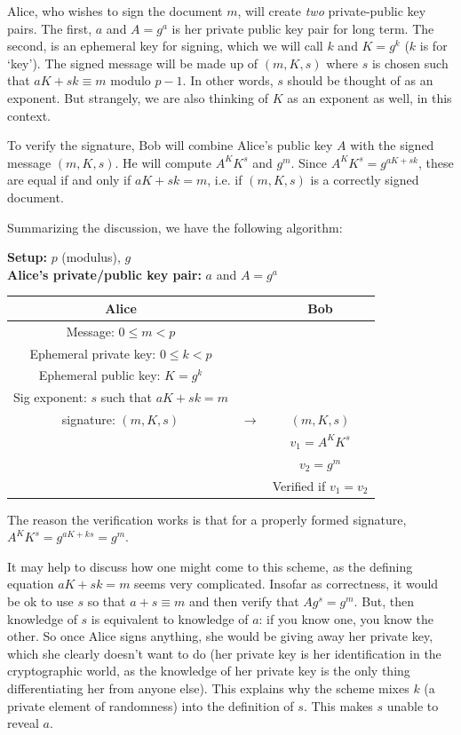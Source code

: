 \documentclass{article}
\theoremstyle{plain}
\theoremstyle{definition}
\theoremstyle{remark}
\numberwithin{theorem}{section}
\begin{document}
Alice, who wishes to sign the document $m$, will create \emph{two} private-public key pairs.  The first, $a$ and $A = g^a$ is her private public key pair for long term.  The second, is an ephemeral key for signing, which we will call $k$ and $K = g^k$ ($k$ is for `key').  The signed message will be made up of $(m, K, s)$ where $s$ is chosen such that $aK + sk\equiv m$ modulo $p-1$.  In other words, $s$ should be thought of as an exponent.  But strangely, we are also thinking of $K$ as an exponent as well, in this context.

To verify the signature, Bob will combine Alice's public key $A$ with the signed message $(m,K,s)$.  He will compute $A^K K^s$ and $g^m$.  Since $A^K K^s = g^{aK + sk}$, these are equal if and only if $aK + sk = m$, i.e. if $(m,K,s)$ is a correctly signed document. 

Summarizing the discussion, we have the following algorithm:

     {\bf Setup:}  $p$ (modulus), $g$ \\
     {\bf Alice's private/public key pair:} $a$ and $A = g^a$
     \vspace{1em}

     \begin{tabular}{ccc}
       Alice & & Bob \\
       \hline
       Message: $0 \le m < p$ & &   \\
       Ephemeral private key: $0 \le k < p$ & &   \\
       Ephemeral public key: $K = g^k$ & &   \\
       Sig exponent: $s$ such that $aK + sk = m$ & & \\
       signature: $(m,K,s)$ & $\longrightarrow$ & $(m,K,s)$ \\
			    & & $v_1 = A^K K^s$ \\
			    & & $v_2 = g^m$ \\
			    & & Verified if $v_1 = v_2$ \\
      \end{tabular}
      \vspace{3em}


      The reason the verification works is that for a properly formed signature, $A^K K^s = g^{aK + ks} = g^m$.

      It may help to discuss how one might come to this scheme, as the defining equation $aK + sk = m$ seems very complicated.  Insofar as correctness, it would be ok to use $s$ so that $a + s \equiv m$ and then verify that $A g^s = g^m$.  But, then knowledge of $s$ is equivalent to knowledge of $a$:  if you know one, you know the other.  So once Alice signs anything, she would be giving away her private key, which she clearly doesn't want to do (her private key is her identification in the cryptographic world, as the knowledge of her private key is the only thing differentiating her from anyone else).  
      This explains why the scheme mixes $k$ (a private element of randomness) into the definition of $s$.  This makes $s$ unable to reveal $a$.  
\end{document}
